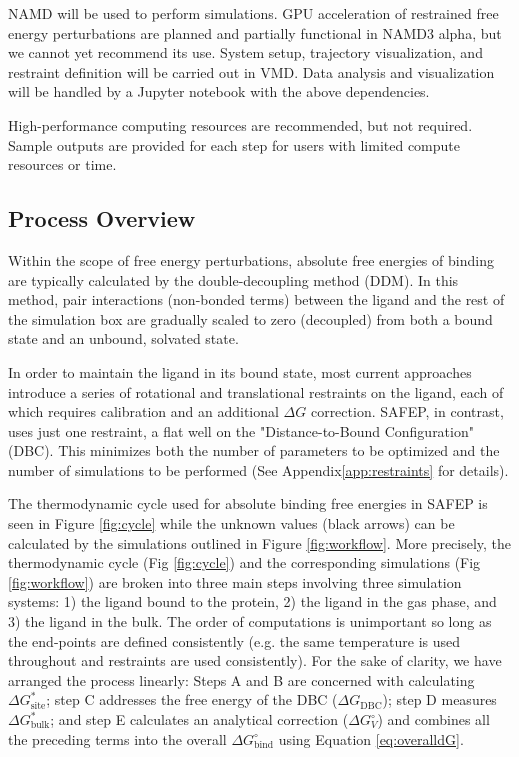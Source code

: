 \documentclass[9pt,tutorial]{Styling/livecoms}
\begin{document}
NAMD will be used to perform simulations. GPU acceleration of restrained free energy perturbations are planned and partially functional in NAMD3 alpha, but we cannot yet recommend its use. \cite{Chen2020, Phillips2020} System setup, trajectory visualization, and restraint definition will be carried out in VMD.\cite{Humphrey1996} Data analysis and visualization will be handled by a Jupyter notebook with the above dependencies.

High-performance computing resources are recommended, but not required. Sample outputs are provided for each step for users with limited compute resources or time.

\subsection{Process Overview} \label{sec:processOverview}

Within the scope of free energy perturbations, absolute free energies of binding are typically calculated by the double-decoupling method (DDM).\cite{Gilson1997, Hamelberg2004, Woo2005} 
In this method, pair interactions (non-bonded terms) between the ligand and the rest of the simulation box are gradually scaled to zero (decoupled) from both a bound state and an unbound, solvated state.

In order to maintain the ligand in its bound state, most current approaches introduce a series of rotational and translational restraints on the ligand, each of which requires calibration and an additional $\Delta G$ correction.
SAFEP, in contrast, uses just one restraint, a flat well on the "Distance-to-Bound Configuration" (DBC). This minimizes both the number of parameters to be optimized and the number of simulations to be performed (See Appendix\ref{app:restraints} for details).

The thermodynamic cycle used for absolute binding free energies in SAFEP is seen in Figure \ref{fig:cycle} while the unknown values (black arrows) can be calculated by the simulations outlined in Figure \ref{fig:workflow}.
More precisely, the thermodynamic cycle (Fig \ref{fig:cycle}) and the corresponding simulations (Fig \ref{fig:workflow}) are broken into three main steps involving three simulation systems: 1) the ligand bound to the protein, 2) the ligand in the gas phase, and 3) the ligand in the bulk. 
The order of computations is unimportant so long as the end-points are defined consistently (e.g. the same temperature is used throughout and restraints are used consistently). 
For the sake of clarity, we have arranged the process linearly: Steps A and B are concerned with calculating $\Delta G^*_\mathrm{site}$; step C addresses the free energy of the DBC ($\Delta G_\mathrm{DBC}$); step D measures $\Delta G^*_\mathrm{bulk}$; and step E calculates an analytical correction ($\Delta G^\circ_V$) and combines all the preceding terms into the overall $\Delta G^\circ_\mathrm{bind}$ using Equation \ref{eq:overalldG}.
 
\end{document}
